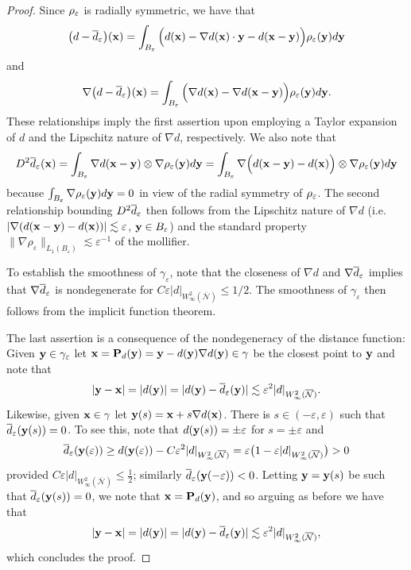 \begin{proof}
Since $\rho_\varepsilon$ is radially symmetric, we have that
\[
\big( d - \overline{d}_\varepsilon  \big)({\bf x}) = \int_{{B_\varepsilon}} \Big( d({\bf x}) - \nabla d({\bf x}) \cdot {\bf y}
- d({\bf x}-{\bf y}) \Big) \rho_\varepsilon({\bf y}) d {\bf y}
\]
%
and
%
\[
\nabla \big( d - \overline{d}_\varepsilon  \big)({\bf x}) =
\int_{{B_\varepsilon}} \Big( \nabla d({\bf x}) - \nabla d({\bf x}-{\bf y}) \Big) \rho_\varepsilon({\bf y}) d {\bf y}.
\]
%
These relationships imply the first assertion upon employing a Taylor expansion of $d$ and the Lipschitz nature of $\nabla d$, respectively. We also note that 
%
\[
D^2 \overline{d}_\varepsilon({\bf x}) = \int_{{B_\varepsilon}} \nabla d({\bf x}-{\bf y}) \otimes \nabla\rho_\varepsilon({\bf y}) d{\bf y}
= \int_{{B_\varepsilon}} \nabla \Big( d({\bf x}-{\bf y}) - d({\bf x}) \Big) \otimes \nabla\rho_\varepsilon({\bf y}) d{\bf y}
\]
%
because $\int_{{B_\varepsilon}} \nabla\rho_\varepsilon({\bf y}) d{\bf y} = 0$ in view of the radial symmetry of $\rho_\varepsilon$. The second relationship bounding $D^2 \overline{d}_\varepsilon$ then follows from the Lipschitz nature of $\nabla d$ (i.e. $|\nabla (d({\bf x}-{\bf y})-d({\bf x}))| \lesssim \varepsilon$, ${\bf y} \in B_\varepsilon$) and the standard property $\|\nabla \rho_\varepsilon\|_{L_1(B_\varepsilon)} \lesssim \varepsilon^{-1}$ of the mollifier. 

To establish the smoothness of $\gamma_\varepsilon$, note that the closeness of $\nabla d$ and $\nabla \overline{d}_\varepsilon$ implies that $\nabla \overline{d}_\varepsilon$ is nondegenerate for $C \varepsilon |d|_{W_\infty^2(\overline{\mathcal{N}})} \le 1/2$.  The smoothness of $\gamma_\varepsilon$ then follows from the implicit function theorem.

The last assertion is a consequence of the nondegeneracy
of the distance function: Given ${\bf y}\in{\gamma_\varepsilon}$ let
${\bf x} = {\bf P}_d({\bf y}) ={\bf y} - d({\bf y}) \nabla d({\bf y})\in\gamma$
be the closest point to ${\bf y}$ and note that
%
\[
|{\bf y}-{\bf x}| = |d({\bf y})| = |d({\bf y})-\overline{d}_\varepsilon({\bf y})| \lesssim \varepsilon^2 |d|_{W_\infty^2(\overline{\mathcal{N}})}. 
\]
%
Likewise, given ${\bf x}\in\gamma$ let ${\bf y}(s) = {\bf x} + s \nabla d({\bf x})$.  There is $s \in (-\varepsilon, \varepsilon)$ such that $\overline{d}_\varepsilon({\bf y}(s))=0$.  To see this,
note that $d({\bf y}(s))=\pm \varepsilon$ for $s=\pm\varepsilon$ and
%
\[
\overline{d}_\varepsilon({\bf y}(\varepsilon)) \ge d({\bf y}(\varepsilon)) - C\varepsilon^{2} |d|_{W_\infty^2(\overline{\mathcal{N}})}
= \varepsilon \big( 1 - \varepsilon |d|_{W_\infty^2(\overline{\mathcal{N}})} \big) > 0
\]
%
provided $C\varepsilon |d|_{W_\infty^2(\overline{\mathcal{N}})}\le\frac12$; similarly
$\overline{d}_\varepsilon({\bf y}(-\varepsilon))<0$. Letting ${\bf y}={\bf y}(s)$ be such that $\overline{d}_\varepsilon({\bf y}(s))=0$, we note that ${\bf x} = {\bf P}_d({\bf y})$, and so arguing as before we have that 
\[ |{\bf y} -{\bf x}|= |d({\bf y})|=|d({\bf y})-\overline{d}_\varepsilon({\bf y})| \lesssim \varepsilon^2 |d|_{W_\infty^2(\overline{\mathcal{N}})},
\]
which concludes the proof.
\end{proof}

